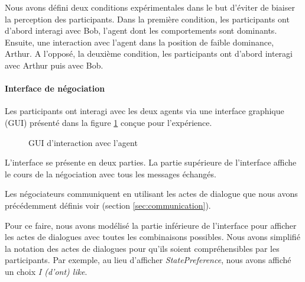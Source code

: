 {					
				Nous avons défini deux conditions expérimentales dans le but d'éviter de biaiser la perception des participants. Dans la première condition, les participants ont d'abord interagi avec Bob, l'agent dont les comportements sont dominants. Ensuite, une interaction avec l'agent dans la position de faible dominance, Arthur.
				A l'opposé, la deuxième condition, les participants ont d'abord interagi  avec Arthur puis avec Bob.
				
				\paragraph{Interface de négociation}			
					Les participants ont interagi avec les deux agents via une interface graphique (GUI) présenté dans la figure \ref{fig:ihm} conçue pour l'expérience. 
					
					\begin{figure}[t]
						\centering
						\caption{GUI d'interaction avec l'agent}
						\label{fig:ihm}
					\end{figure} 
				
				
					L'interface se présente en deux parties. La partie supérieure de l'interface affiche le cours de la négociation avec tous les messages échangés. 
					 
					Les négociateurs communiquent en utilisant les actes de dialogue que nous avons précédemment définis voir (section \ref {sec:communication}). 

					Pour ce faire, nous avons modélisé la partie inférieure de l'interface pour afficher les actes de dialogues avec toutes les combinaisons possibles. 
					Nous avons simplifié la notation des actes de dialogues pour qu'ils soient compréhensibles par les participants. Par exemple, au lieu d'afficher \emph{StatePreference}, nous avons affiché un choix \emph{I (d'ont) like}.
					
}
